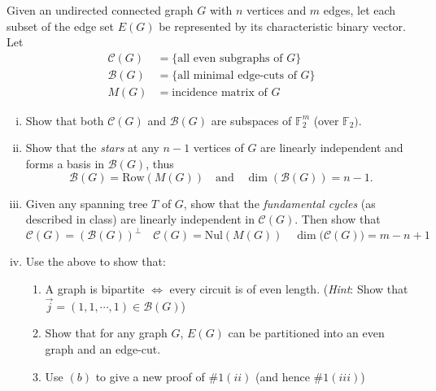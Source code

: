 \documentclass[11pt,letterpaper]{article}
\begin{document}
\begin{quest}[\textcolor{red}{Cycle Space and Bond Space in Graphs + some applications}]
    Given an undirected connected graph $G$ with $n$ vertices and $m$ edges, let each subset of the edge set $E(G)$ be represented by its characteristic binary vector. Let 
    \begin{align*}
        \mathcal{C}(G)&=\{\text{all even subgraphs of } G \}\\
        \mathcal{B}(G)&=\{\text{all minimal edge-cuts of } G\}\\
        M(G)&= \text{incidence matrix of } G
    \end{align*}
    \begin{enumerate}[(i)]
        \item Show that both $\mathcal{C}(G)$ and $\mathcal{B}(G)$ are subspaces of $\mathbb{F}_2^m$ (over $\mathbb{F}_2)$.
        \item Show that the \textit{stars} at any $n-1$ vertices of $G$ are linearly independent and forms a basis in $\mathcal{B}(G)$, thus \[\mathcal{B}(G)=\text{Row}(M(G))\quad\text{and}\quad \dim(\mathcal{B}(G))=n-1.\]
        \item Given any spanning tree $T$ of $G$, show that the \textit{fundamental cycles} (as described in class) are linearly independent in $\mathcal{C}(G)$. Then show that 
        \[\mathcal{C}(G)=(\mathcal{B}(G))^{\perp}\quad\mathcal{C}(G)=\text{Nul}(M(G))\quad \dim\big(\mathcal{C}(G)\big)=m-n+1\]
        \item Use the above to show that:
        \begin{enumerate}
            \item A graph is bipartite $\iff$ every circuit is of even length. (\textit{Hint}: Show that $\overrightarrow{j}=(1,1,\cdots, 1)\in \mathcal{B}(G)$)
            \item Show that for any graph $G$, $E(G)$ can be partitioned into an even graph and an edge-cut.
            \item Use $(b)$ to give a new proof of $\# 1(ii)$ (and hence $\# 1(iii)$)
        \end{enumerate}
    \end{enumerate}
\end{quest}
\end{document}
